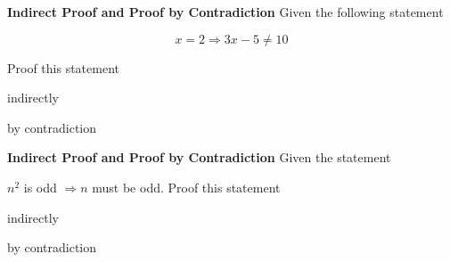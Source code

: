 \documentclass[a4paper,11pt]{exam}
\theoremstyle{definition}
\begin{document}
\printanswers

\begin{center} 
\end{center}


\newtheorem{theorem}{Theorem}
\theoremstyle{definition}
\newtheorem{example}{Example}

\begin{questions}

\question
{\bf Indirect Proof and Proof by Contradiction}
Given the following statement

$$ x = 2 \Rightarrow 3x - 5 \neq 10$$

Proof this statement

\begin{parts}
\item indirectly
\item by contradiction
\end{parts}

\question
{\bf Indirect Proof and Proof by Contradiction}
Given the statement

$n^2$ is odd $\Rightarrow n$ must be odd. Proof this statement

\begin{parts}
\item indirectly
\item by contradiction
\end{parts}

\end{questions}
\end{document}
